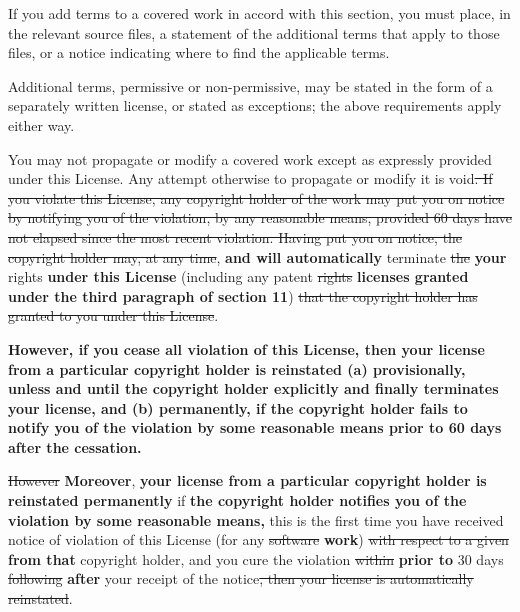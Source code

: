 \documentclass[11pt]{article}
\newcounter{v2section}
\newcounter{v3section}
\begin{document}
  If you add terms to a covered work in accord with this section, you
must place, in the relevant source files, a statement of the additional
terms that apply to those files, or a notice indicating where to find
the applicable terms.

  Additional terms, permissive or non-permissive, may be stated in the
form of a separately written license, or stated as exceptions;
the above requirements apply either way.
  

  You may not propagate or modify a covered work except as expressly
provided under this License.  Any attempt otherwise to propagate or
modify it is void\sout{. If you violate this License, any
copyright holder of the work may put you on notice by notifying you of
the violation, by any reasonable means, provided 60 days have not
elapsed since the most recent violation.  Having put you on notice, the
copyright holder may, at any time}, \textbf{and will automatically}
terminate \sout{the} \textbf{your} rights \textbf{under this License}
(including any patent \sout{rights} \textbf{licenses granted under the
third paragraph of section 11}) \sout{that the copyright holder has
granted to you under this License}.

  \textbf{However, if you cease all violation of this License, then your
license from a particular copyright holder is reinstated (a)
provisionally, unless and until the copyright holder explicitly and
finally terminates your license, and (b) permanently, if the copyright
holder fails to notify you of the violation by some reasonable means
prior to 60 days after the cessation.}

  \sout{However} \textbf{Moreover}, \textbf{your license from a particular
copyright holder is reinstated permanently} if \textbf{the copyright
holder notifies you of the violation by some reasonable means,} this is
the first time you have received notice of violation of this License
(for any \sout{software} \textbf{work}) \sout{with respect to a given}
\textbf{from that} copyright holder, and you cure the violation
\sout{within} \textbf{prior to} 30 days \sout{following} \textbf{after}
your receipt of the notice\sout{, then your license is automatically
reinstated}.
\end{document}
